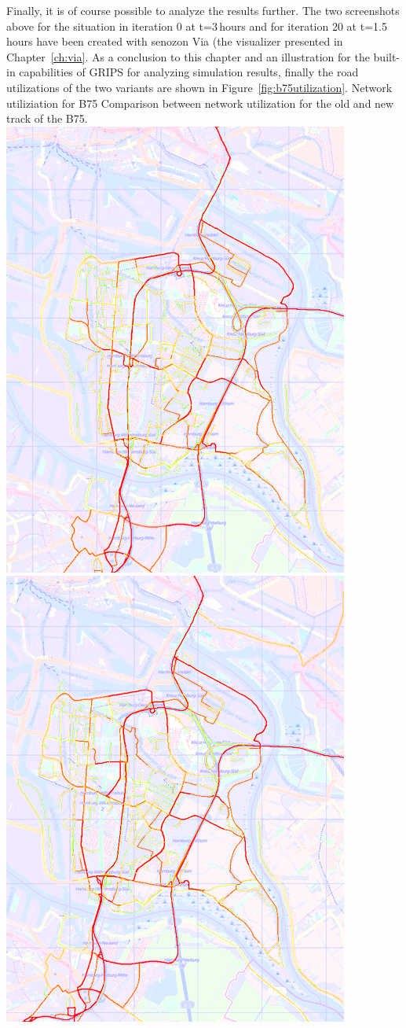 Finally, it is of course possible to analyze the results further. The two screenshots above for the situation in iteration 0 at t=3\,hours and for iteration 20 at t=1.5\,hours have been created with senozon Via (the visualizer presented in Chapter~\ref{ch:via}. As a conclusion to this chapter and an illustration for the built-in capabilities of GRIPS for analyzing simulation results, finally the road utilizations of the two variants are shown in Figure~\ref{fig:b75utilization}.
%
\createfigure%
{Network utiliziation for B75}%
{Comparison between network utilization for the old and new track of the B75.}%
{\label{fig:b75utilization}}%
{%
  \createsubfigure%
  {}%
  {\includegraphics[width=.475\linewidth]{using/figures/b75utilizationold}}%
  {}%
  {}%
  \createsubfigure%
  {}%
  {\includegraphics[width=.475\linewidth]{using/figures/b75utilizationnew}}
  {}%
  {}%
}%
  {}%
